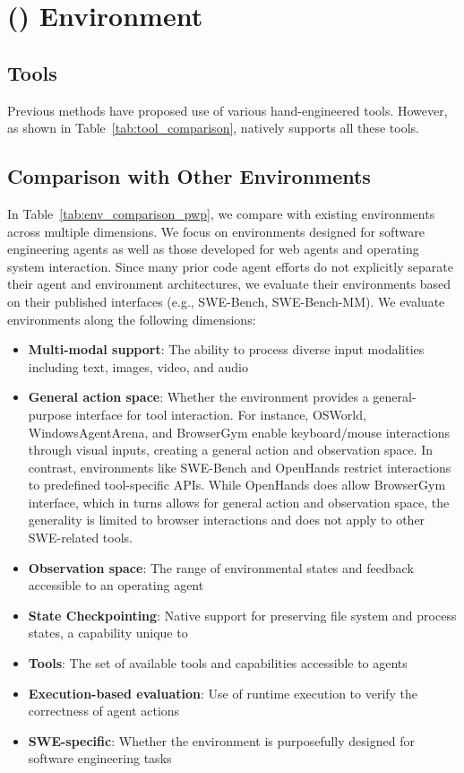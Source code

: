 \section{\Ours{} (\ours{}) Environment}

\subsection{Tools}
\label{app:tools}

Previous methods have proposed use of various hand-engineered tools. However, as shown in Table~\ref{tab:tool_comparison}, \ours{} natively supports all these tools.



\subsection{Comparison with Other Environments}

In Table~\ref{tab:env_comparison_pwp}, we compare \ours{} with existing environments across multiple dimensions. We focus on environments designed for software engineering agents as well as those developed for web agents and operating system interaction. Since many prior code agent efforts do not explicitly separate their agent and environment architectures, we evaluate their environments based on their published interfaces (e.g., SWE-Bench, SWE-Bench-MM).
We evaluate environments along the following dimensions:

\begin{itemize}
    \item \textbf{Multi-modal support}: The ability to process diverse input modalities including text, images, video, and audio
    \item \textbf{General action space}: Whether the environment provides a general-purpose interface for tool interaction. For instance, OSWorld, WindowsAgentArena, and BrowserGym enable keyboard/mouse interactions through visual inputs, creating a general action and observation space. In contrast, environments like SWE-Bench and OpenHands restrict interactions to predefined tool-specific APIs. While OpenHands does allow BrowserGym interface, which in turns allows for general action and observation space, the generality is limited to browser interactions and does not apply to other SWE-related tools.
    \item \textbf{Observation space}: The range of environmental states and feedback accessible to an operating agent
    \item \textbf{State Checkpointing}: Native support for preserving file system and process states, a capability unique to \ours{}
    \item \textbf{Tools}: The set of available tools and capabilities accessible to agents
    \item \textbf{Execution-based evaluation}: Use of runtime execution to verify the correctness of agent actions
    \item \textbf{SWE-specific}: Whether the environment is purposefully designed for software engineering tasks
\end{itemize}

